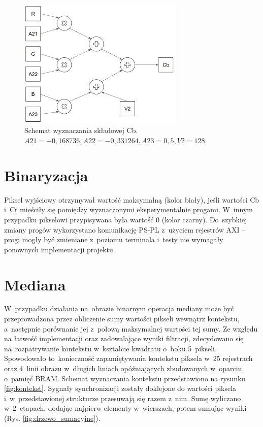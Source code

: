 \begin{figure}[h]
	\centering
	\includegraphics[width=0.7\textwidth]{drzewo_ycbcr.jpg}
	\caption{Schemat wyznaczania składowej Cb. $A21=-0,168736, A22=-0,331264, A23=0,5, V2=128$.}
	\label{fig:drzewo_ycbcr}
\end{figure} 

\section{Binaryzacja}
\label{subsec:Binaryzacja}
Piksel wyjściowy otrzymywał wartość maksymalną (kolor biały), jeśli wartości Cb i~Cr mieściły się pomiędzy wyznaczonymi eksperymentalnie progami.  
W~innym przypadku pikselowi przypisywana była wartość 0 (kolor czarny). 
Do~szybkiej zmiany progów wykorzystano komunikację PS-PL z~użyciem rejestrów AXI -- progi mogły być zmieniane z~poziomu terminala i~testy nie wymagały ponownych implementacji projektu.  


\section{Mediana}
\label{subsec:Mediana}

W~przypadku działania na~obrazie binarnym operacja mediany może być przeprowadzona przez obliczenie sumy wartości pikseli wewnątrz kontekstu, a~następnie porównanie jej z~połową maksymalnej wartości tej sumy. 
Ze względu na łatwość implementacji oraz zadowalające wyniki filtracji, zdecydowano się na~rozpatrywanie kontekstu w~kształcie kwadratu o~boku 5~pikseli. 
Spowodowało to~konieczność zapamiętywania kontekstu piksela w~25 rejestrach oraz 4~linii obrazu w~długich liniach opóźniających zbudowanych w~oparciu o~pamięć BRAM.
Schemat wyznaczania kontekstu przedstawiono na rysunku \ref{fig:kontekst}. 
Sygnały synchronizacji zostały doklejone do wartości piksela i~w~przedstawionej strukturze przesuwają się razem z~nim. 
Sumę wyliczano w~2~etapach, dodając najpierw elementy w~wierszach, potem sumując wyniki (Rys. \ref{fig:drzewo_sumacyjne}).

